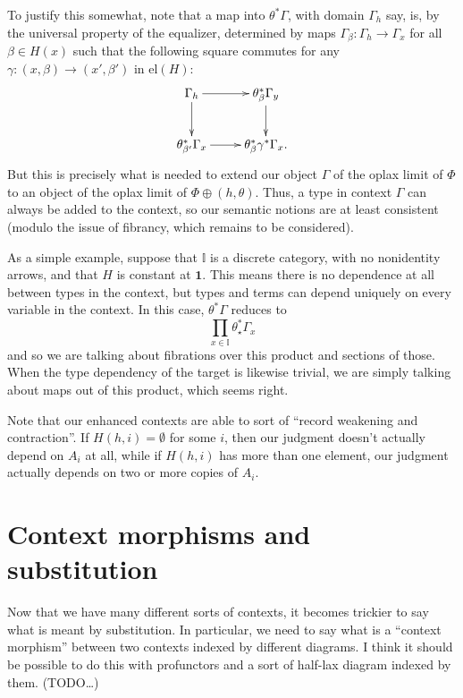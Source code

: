 \documentclass{amsart}
\def\I{\ensuremath{\mathbb{I}}}
\def\el{\mathrm{el}}
\theoremstyle{definition}
\begin{document}
To justify this somewhat, note that a map into $\theta^*\Gamma$, with domain $\Gamma_h$ say, is, by the universal property of the equalizer, determined by maps $\Gamma_{\beta} : \Gamma_h \to \Gamma_x$ for all $\beta\in H(x)$ such that the following square commutes for any ${\gamma : (x,\beta)\to (x',\beta')}$ in $\el(H)$:
\begin{equation*}
  \vcenter{\xymatrix{
      \Gamma_h \ar[r]\ar[d] &
      \theta_\beta^* \Gamma_y\ar[d]\\
      \theta_{\beta'}^* \Gamma_x \ar[r] &
      \theta_\beta^* \gamma^* \Gamma_x.
    }}
\end{equation*}
But this is precisely what is needed to extend our object $\Gamma$ of the oplax limit of $\Phi$ to an object of the oplax limit of $\Phi \oplus (h,\theta)$.
Thus, a type in context $\Gamma$ can always be added to the context, so our semantic notions are at least consistent (modulo the issue of fibrancy, which remains to be considered).

As a simple example, suppose that $\I$ is a discrete category, with no nonidentity arrows, and that $H$ is constant at $\mathbf{1}$.
This means there is no dependence at all between types in the context, but types and terms can depend uniquely on every variable in the context.
In this case, $\theta^* \Gamma$ reduces to
\[ \prod_{x\in \I} \theta_{\star}^* \Gamma_x \]
and so we are talking about fibrations over this product and sections of those.
When the type dependency of the target is likewise trivial, we are simply talking about maps out of this product, which seems right.

Note that our enhanced contexts are able to sort of ``record weakening and contraction''.
If $H(h,i)=\emptyset$ for some $i$, then our judgment doesn't actually depend on $A_i$ at all, while if $H(h,i)$ has more than one element, our judgment actually depends on two or more copies of $A_i$.

\section{Context morphisms and substitution}
\label{sec:substitution}

Now that we have many different sorts of contexts, it becomes trickier to say what is meant by substitution.
In particular, we need to say what is a ``context morphism'' between two contexts indexed by different diagrams.
I think it should be possible to do this with profunctors and a sort of half-lax diagram indexed by them.
(TODO\dots)
\end{document}
